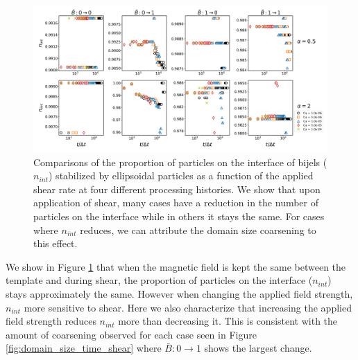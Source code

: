 \begin{figure} 
    \centering 
    \includegraphics[scale=0.3]{../figures/results/paper3/n_int-time_compare.png} 
    \caption{Comparisons of the proportion of particles on the interface of bijels ($n_{int}$) stabilized by ellipsoidal particles as a function of 
             the applied shear rate at four different processing histories. We show that upon application of shear, many cases have a 
             reduction in the number of particles on the interface while in others it stays the same. For cases where $n_{int}$ reduces, we can 
             attribute the domain size coarsening to this effect.} 
    \label{fig:particles_interface_prop_shear} 
\end{figure}

We show in Figure \ref{fig:particles_interface_prop_shear} that when the magnetic field is kept the same between the template and during shear, the
proportion of particles on the interface ($n_{int}$) stays approximately the same. However when changing the applied field strength, $n_{int}$ more 
sensitive to shear. Here we also characterize that increasing the applied field strength reduces $n_{int}$ more than decreasing it. This is consistent
with the amount of coarsening observed for each case seen in Figure \ref{fig:domain_size_time_shear} where $\bar{B}:0 \rightarrow 1$ shows the largest
change. 